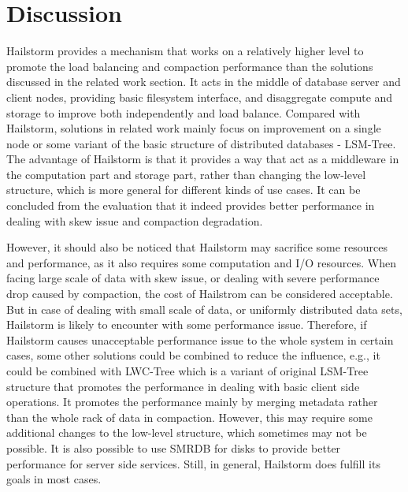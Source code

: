 \documentclass[a4paper,10pt,twoside]{article}
\begin{document}
\section{Discussion}
\label{Diss}
Hailstorm provides a mechanism that works on a relatively higher level to promote the load balancing and compaction performance than the solutions discussed in the related work section.
It acts in the middle of database server and client nodes, providing basic filesystem interface, and disaggregate compute and storage to improve both independently and load balance.
Compared with Hailstorm, solutions in related work mainly focus on improvement on a single node or some variant of the basic structure of distributed databases - LSM-Tree.
The advantage of Hailstorm is that it provides a way that act as a middleware in the computation part and storage part, rather than changing the low-level structure, 
which is more general for different kinds of use cases.
It can be concluded from the evaluation that it indeed provides better performance in dealing with skew issue and compaction degradation.
\par
However, it should also be noticed that Hailstorm may sacrifice some resources and performance, as it also requires some computation and I/O resources.
When facing large scale of data with skew issue, or dealing with severe performance drop caused by compaction, the cost of Hailstrom can be considered acceptable.
But in case of dealing with small scale of data, or uniformly distributed data sets, Hailstorm is likely to encounter with some performance issue.
Therefore, if Hailstorm causes unacceptable performance issue to the whole system in certain cases, some other solutions could be combined to reduce the influence, 
e.g., it could be combined with LWC-Tree which is a variant of original LSM-Tree structure that promotes the performance in dealing with basic client side operations.
It promotes the performance mainly by merging metadata rather than the whole rack of data in compaction. 
However, this may require some additional changes to the low-level structure, which sometimes may not be possible.
It is also possible to use SMRDB for disks to provide better performance for server side services.
Still, in general, Hailstorm does fulfill its goals in most cases.
\end{document}
